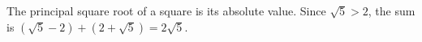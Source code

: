 The principal square root of a square is its absolute value. Since $\sqrt5>2 $, the sum is $(\sqrt5-2)+(2+\sqrt5)=\boxed{2\sqrt5}$.
